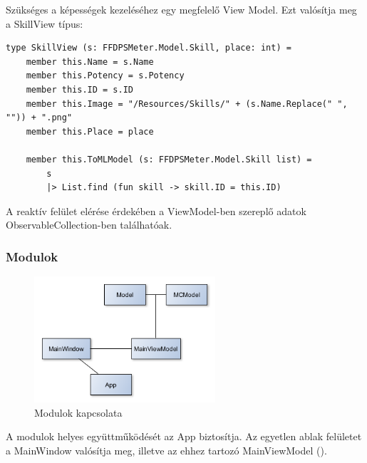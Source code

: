 \documentclass[12pt]{article}
\begin{document}
Szükséges a képességek kezeléséhez egy megfelelő View Model. Ezt valósítja meg a SkillView típus:

\begin{lstlisting}
type SkillView (s: FFDPSMeter.Model.Skill, place: int) =
    member this.Name = s.Name
    member this.Potency = s.Potency
    member this.ID = s.ID
    member this.Image = "/Resources/Skills/" + (s.Name.Replace(" ", "")) + ".png"
	member this.Place = place

	member this.ToMLModel (s: FFDPSMeter.Model.Skill list) =
		s
		|> List.find (fun skill -> skill.ID = this.ID)
\end{lstlisting}

A reaktív felület elérése érdekében a ViewModel-ben szereplő adatok ObservableCollection-ben találhatóak.

\subsubsection{Modulok}

\begin{figure}[H]
	\begin{center}
		\includegraphics[width=0.6\textwidth]{viewuml}
	\end{center}
	\caption{Modulok kapcsolata}
	\label{fig:viewuml}
\end{figure}

A modulok helyes együttműködését az App biztosítja. Az egyetlen ablak felületet a MainWindow valósítja meg, illetve az ehhez tartozó MainViewModel ().
\end{document}

